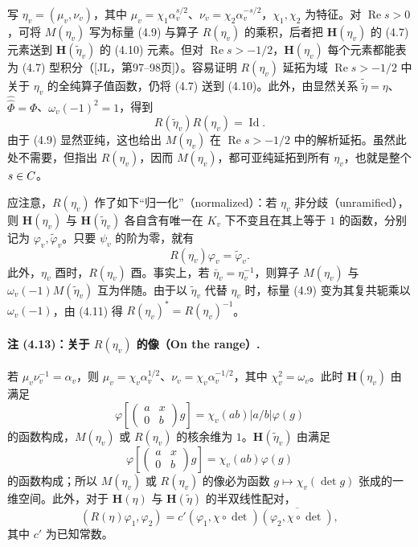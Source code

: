 写 $\eta_v=(\mu_v,\nu_v)$，其中
$\mu_v=\chi_1\alpha_v^{s/2}$、$\nu_v=\chi_2\alpha_v^{-s/2}$，$\chi_1,\chi_2$ 为特征。对
$\operatorname{Re}s>0$，可将 $M(\eta_v)$ 写为标量 (4.9) 与算子 $R(\eta_v)$ 的乘积，后者把
$\mathbf H(\eta_v)$ 的 (4.7) 元素送到 $\mathbf H(\widetilde\eta_v)$ 的 (4.10) 元素。但对
$\operatorname{Re}s>-1/2$，$\mathbf H(\eta_v)$ 每个元素都能表为 (4.7) 型积分（[JL，第97--98页]）。容易证明 $R(\eta_v)$ 延拓为域 $\operatorname{Re}s>-1/2$ 中关于 $\eta_v$ 的全纯算子值函数，仍将 (4.7) 送到 (4.10)。此外，由显然关系
$\widetilde{\widetilde\eta}=\eta$、$\widehat{\widehat\Phi}=\Phi$、$\omega_v(-1)^2=1$，得到
\begin{equation}
 R(\widetilde\eta_v)R(\eta_v)=\operatorname{Id}.\tag{4.11}
\end{equation}
由于 (4.9) 显然亚纯，这也给出 $M(\eta_v)$ 在 $\operatorname{Re}s>-1/2$ 中的解析延拓。虽然此处不需要，但指出
$R(\eta_v)$，因而 $M(\eta_v)$，都可亚纯延拓到所有 $\eta_v$，也就是整个 $s\in C$。

应注意，$R(\eta_v)$ 作了如下“归一化”（normalized）：若 $\eta_v$ 非分歧（unramified），则
$\mathbf H(\eta_v)$ 与 $\mathbf H(\widetilde\eta_v)$ 各自含有唯一在 $K_v$ 下不变且在其上等于 $1$ 的函数，分别记为 $\varphi_v,\widetilde\varphi_v$。只要 $\psi_v$ 的阶为零，就有
\begin{equation}
 R(\eta_v)\varphi_v=\widetilde\varphi_v.\tag{4.12}
\end{equation}
此外，$\eta_v$ 酉时，$R(\eta_v)$ 酉。事实上，若 $\bar\eta_v=\eta_v^{-1}$，则算子
$M(\eta_v)$ 与 $\omega_v(-1)M(\widetilde\eta_v)$ 互为伴随。由于以 $\widetilde\eta_v$ 代替
$\eta_v$ 时，标量 (4.9) 变为其复共轭乘以 $\omega_v(-1)$，由 (4.11) 得
$R(\eta_v)^*=R(\eta_v)^{-1}$。

\paragraph*{注 (4.13)：关于 $R(\eta_v)$ 的像（On the range）.}
若 $\mu_v\nu_v^{-1}=\alpha_v$，则
$\mu_v=\chi_v\alpha_v^{1/2}$、$\nu_v=\chi_v\alpha_v^{-1/2}$，其中 $\chi_v^2=\omega_v$。此时
$\mathbf H(\eta_v)$ 由满足
\[
 \varphi\!\left[\begin{pmatrix}a&x\\0&b\end{pmatrix}g\right]
 =\chi_v(ab)|a/b|\varphi(g)
\]
的函数构成，$M(\eta_v)$ 或 $R(\eta_v)$ 的核余维为 $1$。$\mathbf H(\widetilde\eta_v)$ 由满足
\[
 \varphi\!\left[\begin{pmatrix}a&x\\0&b\end{pmatrix}g\right]=\chi_v(ab)\varphi(g)
\]
的函数构成；所以 $M(\eta_v)$ 或 $R(\eta_v)$ 的像必为函数 $g\mapsto\chi_v(\det g)$ 张成的一维空间。此外，对于 $\mathbf H(\eta)$ 与 $\mathbf H(\widetilde\eta)$ 的半双线性配对，
\begin{equation}
 (R(\eta)\varphi_1,\varphi_2)
 =c'(\varphi_1,\chi\circ\det)\overline{(\varphi_2,\chi\circ\det)},\tag{4.14}
\end{equation}
其中 $c'$ 为已知常数。

